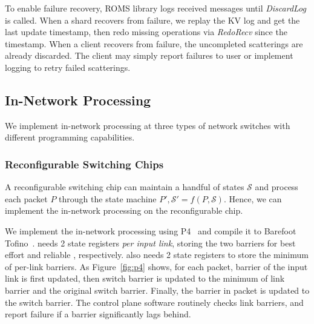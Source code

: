 To enable failure recovery, ROMS library logs received messages until \emph{DiscardLog} is called.
When a shard recovers from failure, we replay the KV log and get the last update timestamp, then redo missing operations via \emph{RedoRecv} since the timestamp.
When a client recovers from failure, the uncompleted scatterings are already discarded.
The client may simply report failures to user or implement logging to retry failed scatterings.
\fi


\subsection{In-Network Processing}
\label{sec:in-network-processing}

We implement in-network processing at three types of network switches with different programming capabilities.


\subsubsection{Reconfigurable Switching Chips}
\label{sec:p4}
A reconfigurable switching chip can maintain 
a handful of states $\mathcal{S}$ and process each packet $P$ through the state machine $P', \mathcal{S}' = f(P, \mathcal{S})$. Hence, we can implement the in-network processing on the reconfigurable chip. 

We implement the in-network processing using P4~\cite{bosshart2014p4} and compile it to Barefoot Tofino~\cite{tofino}. \sys{} needs 2 state registers \emph{per input link}, storing the two barriers for best effort and reliable \sys{}, respectively. \sys{} also needs 2 state registers to store the minimum of per-link barriers. As Figure~\ref{fig:p4} shows, for each packet, barrier of the input link is first updated, then switch barrier is updated to the minimum of link barrier and the original switch barrier. Finally, the barrier in packet is updated to the switch barrier. The control plane software routinely checks link barriers, and report failure if a barrier significantly lags behind.



